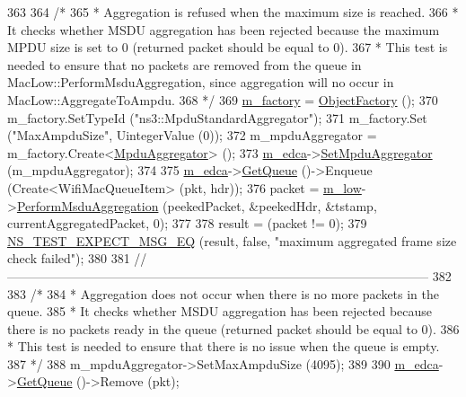 \begin{DoxyCode}
363 
364   \textcolor{comment}{/*}
365 \textcolor{comment}{   * Aggregation is refused when the maximum size is reached.}
366 \textcolor{comment}{   * It checks whether MSDU aggregation has been rejected because the maximum MPDU size is set to 0
       (returned packet should be equal to 0).}
367 \textcolor{comment}{   * This test is needed to ensure that no packets are removed from the queue in
       MacLow::PerformMsduAggregation, since aggregation will no occur in MacLow::AggregateToAmpdu.}
368 \textcolor{comment}{   */}
369   \hyperlink{classTwoLevelAggregationTest_a5b0df48a92f6160fbdf46911f2dc6e26}{m\_factory} = \hyperlink{classns3_1_1ObjectFactory}{ObjectFactory} ();
370   m\_factory.SetTypeId (\textcolor{stringliteral}{"ns3::MpduStandardAggregator"});
371   m\_factory.Set (\textcolor{stringliteral}{"MaxAmpduSize"}, UintegerValue (0));
372   m\_mpduAggregator = m\_factory.Create<\hyperlink{classns3_1_1MpduAggregator}{MpduAggregator}> ();
373   \hyperlink{classTwoLevelAggregationTest_a6ec1a641b23f7f6d1652462575d4feb1}{m\_edca}->\hyperlink{classns3_1_1EdcaTxopN_a7e7515c14b633de6c10087f02864b793}{SetMpduAggregator} (m\_mpduAggregator);
374 
375   \hyperlink{classTwoLevelAggregationTest_a6ec1a641b23f7f6d1652462575d4feb1}{m\_edca}->\hyperlink{classns3_1_1DcaTxop_a6c89d0aeccbc5e8724d404bc45f796d7}{GetQueue} ()->Enqueue (Create<WifiMacQueueItem> (pkt, hdr));
376   packet = \hyperlink{classTwoLevelAggregationTest_a408234bde940ec7a7a61112d512f7a63}{m\_low}->\hyperlink{classns3_1_1MacLow_aabd112b43fd3be901c743b21d41f787f}{PerformMsduAggregation} (peekedPacket, &peekedHdr, &tstamp, 
      currentAggregatedPacket, 0);
377 
378   result = (packet != 0);
379   \hyperlink{group__testing_ga7304ba46a28d8cf08dfdfd6499cf7068}{NS\_TEST\_EXPECT\_MSG\_EQ} (result, \textcolor{keyword}{false}, \textcolor{stringliteral}{"maximum aggregated frame size check failed"});
380 
381   \textcolor{comment}{//-----------------------------------------------------------------------------------------------------}
382 
383   \textcolor{comment}{/*}
384 \textcolor{comment}{   * Aggregation does not occur when there is no more packets in the queue.}
385 \textcolor{comment}{   * It checks whether MSDU aggregation has been rejected because there is no packets ready in the queue
       (returned packet should be equal to 0).}
386 \textcolor{comment}{   * This test is needed to ensure that there is no issue when the queue is empty.}
387 \textcolor{comment}{   */}
388   m\_mpduAggregator->SetMaxAmpduSize (4095);
389 
390   \hyperlink{classTwoLevelAggregationTest_a6ec1a641b23f7f6d1652462575d4feb1}{m\_edca}->\hyperlink{classns3_1_1DcaTxop_a6c89d0aeccbc5e8724d404bc45f796d7}{GetQueue} ()->Remove (pkt);

\end{DoxyCode}
